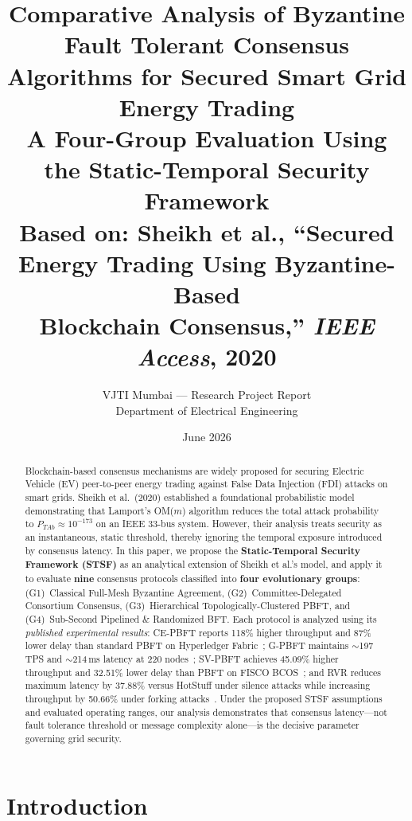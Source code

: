 \documentclass[10pt,twocolumn,letterpaper]{article}
\title{\textbf{Comparative Analysis of Byzantine Fault Tolerant Consensus\\Algorithms for Secured Smart Grid Energy Trading}\\[8pt]
\large A Four-Group Evaluation Using the Static-Temporal Security Framework\\[4pt]
\normalsize Based on: Sheikh et al., ``Secured Energy Trading Using Byzantine-Based\\Blockchain Consensus,'' \emph{IEEE Access}, 2020}
\author{%
VJTI Mumbai --- Research Project Report\\
Department of Electrical Engineering\\[4pt]
\small \emph{}
}
\date{June 2026}
\begin{document}
\maketitle

\begin{abstract}
Blockchain-based consensus mechanisms are widely proposed for securing Electric Vehicle (EV) peer-to-peer energy trading against False Data Injection (FDI) attacks on smart grids. Sheikh et al.\ (2020) established a foundational probabilistic model demonstrating that Lamport's OM($m$) algorithm reduces the total attack probability to $P_{TAb} \approx 10^{-173}$ on an IEEE 33-bus system. However, their analysis treats security as an instantaneous, static threshold, thereby ignoring the temporal exposure introduced by consensus latency. In this paper, we propose the \textbf{Static-Temporal Security Framework (STSF)} as an analytical extension of Sheikh et al.'s model, and apply it to evaluate \textbf{nine} consensus protocols classified into \textbf{four evolutionary groups}: (G1)~Classical Full-Mesh Byzantine Agreement, (G2)~Committee-Delegated Consortium Consensus, (G3)~Hierarchical Topologically-Clustered PBFT, and (G4)~Sub-Second Pipelined \& Randomized BFT. Each protocol is analyzed using its \emph{published experimental results}: CE-PBFT reports 118\% higher throughput and 87\% lower delay than standard PBFT on Hyperledger Fabric~\cite{ding2024}; G-PBFT maintains $\sim$197 TPS and $\sim$214\,ms latency at 220 nodes~\cite{xu2025}; SV-PBFT achieves 45.09\% higher throughput and 32.51\% lower delay than PBFT on FISCO BCOS~\cite{suo2025}; and RVR reduces maximum latency by 37.88\% versus HotStuff under silence attacks while increasing throughput by 50.66\% under forking attacks~\cite{wang2025}. Under the proposed STSF assumptions and evaluated operating ranges, our analysis demonstrates that consensus latency---not fault tolerance threshold or message complexity alone---is the decisive parameter governing grid security.
\end{abstract}

\section{Introduction}
\end{document}
